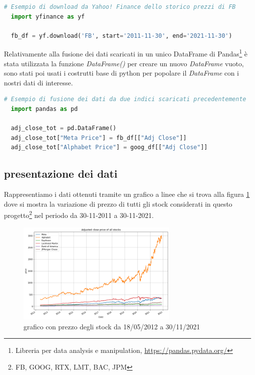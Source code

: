 \documentclass{article}
\begin{document}
\begin{lstlisting}[language=Python]
  # Esempio di download da Yahoo! Finance dello storico prezzi di FB
  import yfinance as yf

  fb_df = yf.download('FB', start='2011-11-30', end='2021-11-30')
\end{lstlisting}

Relativamente alla fusione dei dati scaricati in un unico DataFrame di Pandas\footnote{Libreria per data analysis e manipulation, 
\href{https://pandas.pydata.org/}{https://pandas.pydata.org/}} è stata utilizzata la funzione \emph{DataFrame()} 
per creare un nuovo \emph{DataFrame} vuoto, sono stati poi usati i costrutti base di python per popolare il \emph{DataFrame} con i nostri dati di interesse.

\begin{lstlisting}[language=Python]
  # Esempio di fusione dei dati da due indici scaricati precedentemente
  import pandas as pd

  adj_close_tot = pd.DataFrame()
  adj_close_tot["Meta Price"] = fb_df[["Adj Close"]]
  adj_close_tot["Alphabet Price"] = goog_df[["Adj Close"]]
\end{lstlisting}


\subsection{presentazione dei dati}

Rappresentiamo i dati ottenuti tramite un grafico a linee che si trova alla figura \ref{fig:all_stocks_price} dove 
si mostra la variazione di prezzo di tutti gli stock considerati in questo progetto\footnote{FB, GOOG, RTX, LMT, BAC, JPM} nel periodo 
da 30-11-2011 a 30-11-2021.

\begin{figure}[h]
  \centering
  \includegraphics[width=0.7\textwidth]{all_stocks_price.png}
  \caption{grafico con prezzo degli stock da 18/05/2012 a 30/11/2021}
  \label{fig:all_stocks_price}
\end{figure}
\end{document}
